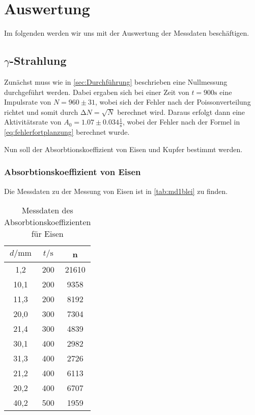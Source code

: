 \section{Auswertung}
\label{sec:Auswertung}

Im folgenden werden wir uns mit der Auswertung der Messdaten beschäftigen.

\subsection[Gamma-Strahlung]{$\gamma$-Strahlung}

Zunächst muss wie in \ref{sec:Durchführung} beschrieben eine Nullmessung durchgeführt werden.
Dabei ergaben sich bei einer Zeit von $t = 900 \unit\second$ eine Impulsrate von $N = 960 \pm 31$,
wobei sich der Fehler nach der Poissonverteilung richtet und somit durch $\increment N = \sqrt{N}$ berechnet wird.
Daraus erfolgt dann eine Aktivitätsrate von $A_0 = 1.07 \pm 0.034 \frac{1}{\unit\second}$, wobei der Fehler nach
der Formel in \autoref{eq:fehlerfortplanzung} berechnet wurde.

Nun soll der Absorbtionskoeffizient von Eisen und Kupfer bestimmt werden.

\subsubsection*{Absorbtionskoeffizient von Eisen}

Die Messdaten zu der Messung von Eisen ist in \autoref{tab:md1blei} zu finden.

\begin{table}
    \center
    \begin{tabular}{c c c}
        \toprule
        $d / \unit{\milli\meter}$ &  $t / \unit\second$ &     n \\ 
        \midrule
            1,2 &  200 & 21610 \\
           10,1 &  200 &  9358 \\
           11,3 &  200 &  8192 \\
           20,0 &  300 &  7304 \\
           21,4 &  300 &  4839 \\
           30,1 &  400 &  2982 \\
           31,3 &  400 &  2726 \\
           21,2 &  400 &  6113 \\
           20,2 &  400 &  6707 \\
           40,2 &  500 &  1959 \\
        \bottomrule
    \end{tabular}
    \caption{Messdaten des Absorbtionskoeffizienten für Eisen}
    \label{tab:md1blei}
\end{table}

